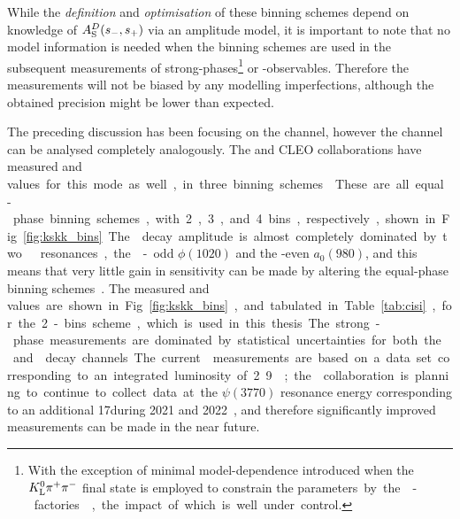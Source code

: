 

While the \emph{definition} and \emph{optimisation} of these binning schemes depend on knowledge of $A_{\rm S}^{D}(s_-, s_+)$ via an amplitude model, it is important to note that no model information is needed when the binning schemes are used in the subsequent measurements of strong-phases\footnote{With the exception of minimal model-dependence introduced when the ${{K}^0_{\mathrm{L}}}{{\pi}^+}{{\pi}^-}$ final state is employed to constrain the \si parameters by the \D-factories~\cite{CLEOCISI,BESCISI,BESCISIKSKK}, the impact of which is well under control.} or \CP-observables. Therefore the measurements will not be biased by any modelling imperfections, although the obtained precision might be lower than expected. 





The preceding discussion has been focusing on the \DtoKspipi channel, however the \DtoKsKK channel can be analysed completely analogously. The \besiii and CLEO collaborations have measured \ci and \si values for this mode as well, in three binning schemes~\cite{CLEOCISI,BESCISIKSKK}. These are all equal-phase binning schemes, with 2, 3, and 4 bins, respectively, shown in Fig.~\ref{fig:kskk_bins}. The \DtoKsKK decay amplitude is almost completely dominated by two \Kp\Km resonances, the \CP-odd $\phi(1020)$ and the \CP-even  $a_0(980)$, and this means that very little gain in sensitivity can be made by altering the equal-phase binning schemes~\cite{CLEOCISI}. The measured \ci and \si values are shown in Fig.~\ref{fig:kskk_bins}, and tabulated in Table~\ref{tab:cisi}, for the 2-bins scheme, which is used in this thesis. 

The strong-phase measurements are dominated by statistical uncertainties for both the \DtoKspp and \DtoKskk decay channels. The current \besiii measurements are based on a data set corresponding to an integrated luminosity of 2.9\invfb; the \besiii collaboration is planning to continue to collect data at the $\psi(3770)$ resonance energy corresponding to an additional 17\invfb during 2021 and 2022~\cite{BESTimescale}, and therefore significantly improved measurements can be made in the near future.

